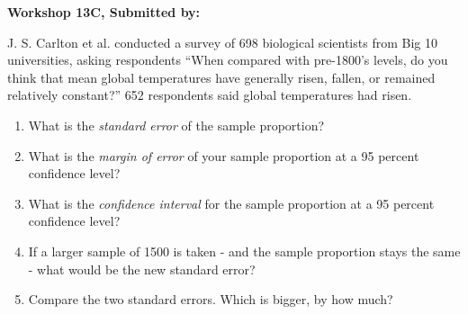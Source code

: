 \documentclass[11pt, chapterprefix=true]{scrbook}\usepackage[]{graphicx}\usepackage[]{color}
\begin{document}
\begin{exercises}
\begin{solution}

\end{solution}

\clearpage

    \begin{exercise}  %


    \begin{center}
\begin{flushleft}\textbf{\large \hfill Workshop 13C, Submitted by: }\end{flushleft}

\end{center}   %

J. S. Carlton et al. conducted a survey of 698 biological scientists from Big 10 universities, asking respondents “When compared with pre-1800’s levels, do you think that mean global temperatures have generally risen, fallen, or remained relatively constant?” 652 respondents said global temperatures had risen.

\begin{enumerate}
\item What is the \textit{standard error} of the sample proportion?
\item What is the \textit{margin of error} of your sample proportion at a 95 percent confidence level?
\item What is the \textit{confidence interval} for the sample proportion at a 95 percent confidence level?
\item If a larger sample of 1500 is taken - and the sample proportion stays the same - what would be the new standard error?
\item Compare the two standard errors. Which is bigger, by how much?
\end{enumerate}


\end{exercise}
\end{exercises}
\end{document}
